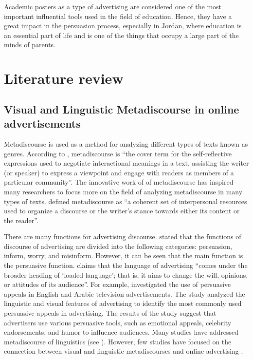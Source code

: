 \documentclass[english]{textolivre}
\begin{document}
Academic posters as a type of advertising are considered one of the most important influential tools used in the field of education. Hence, they have a great impact in the persuasion process, especially in Jordan, where education is an essential part of life and is one of the things that occupy a large part of the minds of parents.

\section{Literature review}\label{sec-normas}
\subsection{Visual and Linguistic Metadiscourse in online advertisements}
Metadiscourse is used as a method for analyzing different types of texts known as genres. According to \textcite[p.~56]{hyland_discourse_2013}, metadiscourse is “the cover term for the self-reflective expressions used to negotiate interactional meanings in a text, assisting the writer (or speaker) to express a viewpoint and engage with readers as members of a particular community”. The innovative work of \textcite{crismore_talking_1989} of metadiscourse has inspired many researchers to focus more on the field of analyzing metadiscourse in many types of texts. \textcite[p.~17]{hyland_metadiscourse:_2022} defined metadiscourse as “a coherent set of interpersonal resources used to organize a discourse or the writer’s stance towards either its content or the reader”.

There are many functions for advertising discourse. \textcite{cook_discourse_2001} stated that the functions of discourse of advertising are divided into the following categories: persuasion, inform, worry, and misinform. However, it can be seen that the main function is the persuasive function. \textcite[p.~25]{leech_linguistic_1969} claims that the language of advertising “comes under the broader heading of ‘loaded language’; that is, it aims to change the will, opinions, or attitudes of its audience”. For example, \textcite{rababah_persuasive_2016} investigated the use of persuasive appeals in English and Arabic television advertisements. The study analyzed the linguistic and visual features of advertising to identify the most commonly used persuasive appeals in advertising. The results of the study suggest that advertisers use various persuasive tools, such as emotional appeals, celebrity endorsements, and humor to influence audiences. Many studies have addressed metadiscourse of linguistics (see \textcite{longo_role_1994,crismore_talking_1989,hyland_metadiscourse:_2010,Povolna_2020}). However, few studies have focused on the connection between visual and linguistic metadiscourses and online advertising \cite{fuertes-olivera_persuasion_2001,gustafsson_metadiscourse_nodate}.
\end{document}
